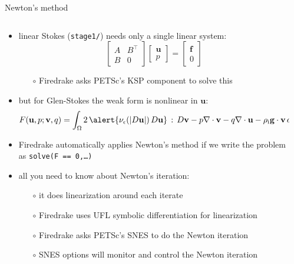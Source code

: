 \documentclass[10pt,
               hyperref={colorlinks,citecolor=DeepPink4,linkcolor=black,urlcolor=blue},
               svgnames]{beamer}
\newcommand{\bbf}{\mathbf{f}}
\newcommand{\bv}{\mathbf{v}}
\newcommand{\bu}{\mathbf{u}}
\newcommand{\eps}{\epsilon}
\newcommand{\rhoi}{\rho_{\text{i}}}
\begin{document}
\begin{frame}{Newton's method}

\begin{columns}
\begin{column}{0.8\textwidth}
\begin{itemize}
\item linear Stokes \small (\texttt{stage1/}) \normalsize needs only a single linear system:
  $$\begin{bmatrix} A & B^\top \\ B & 0 \end{bmatrix} \begin{bmatrix} \bu \\ p  \end{bmatrix} = \begin{bmatrix} \bbf \\ 0 \end{bmatrix}$$
    \begin{itemize}
    \item[$\circ$] Firedrake asks PETSc's KSP component to solve this
    \end{itemize}
\item but for Glen-Stokes the weak form is nonlinear in $\bu$:
\small
$$F(\bu,p;\bv,q) = \int_{\Omega} 2\, \alert{\nu_\eps(|D\bu|)\, D\bu}\,:\,D\bv - p \nabla \cdot \bv - q \nabla \cdot \bu - \rhoi \mathbf{g} \cdot \bv \,dx$$
\normalsize
\item Firedrake automatically applies Newton's method if we write the problem as \texttt{solve(F == 0,\dots)}
\item all you need to know about Newton's iteration:
    \begin{itemize}
    \item[$\circ$] it does linearization around each iterate
    \item[$\circ$] Firedrake uses UFL symbolic differentiation for linearization
    \item[$\circ$] Firedrake asks PETSc's SNES to do the Newton iteration
    \item[$\circ$] SNES options will monitor and control the Newton iteration
    \end{itemize}
\end{itemize}
\end{column}
\begin{column}{0.2\textwidth}
\vspace{25mm}


\end{column}
\end{columns}
\end{frame}
\end{document}
